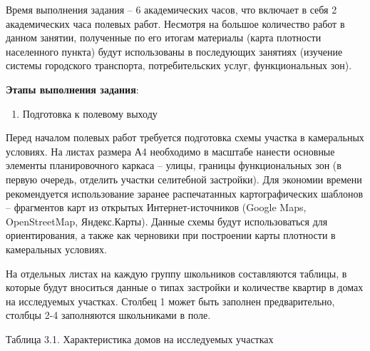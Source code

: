 \documentclass[
  11pt,
]{book}
\providecommand{\tightlist}{%
  \setlength{\itemsep}{0pt}\setlength{\parskip}{0pt}}
\begin{document}
Время выполнения задания -- 6 академических часов, что включает в себя 2 академических часа полевых работ. Несмотря на большое количество работ в данном занятии, полученные по его итогам материалы (карта плотности населенного пункта) будут использованы в последующих занятиях (изучение системы городского транспорта, потребительских услуг, функциональных зон).

\textbf{Этапы выполнения задания}:

\begin{enumerate}
\def\labelenumi{\arabic{enumi}.}
\tightlist
\item
  Подготовка к полевому выходу
\end{enumerate}

Перед началом полевых работ требуется подготовка схемы участка в камеральных условиях. На листах размера А4 необходимо в масштабе нанести основные элементы планировочного каркаса -- улицы, границы функциональных зон (в первую очередь, отделить участки селитебной застройки). Для экономии времени рекомендуется использование заранее распечатанных картографических шаблонов -- фрагментов карт из открытых Интернет-источников (Google Maps, OpenStreetMap, Яндекс.Карты). Данные схемы будут использоваться для ориентирования, а также как черновики при построении карты плотности в камеральных условиях.

На отдельных листах на каждую группу школьников составляются таблицы, в которые будут вноситься данные о типах застройки и количестве квартир в домах на исследуемых участках. Столбец 1 может быть заполнен предварительно, столбцы 2-4 заполняются школьниками в поле.

Таблица 3.1. Характеристика домов на исследуемых участках
\end{document}
